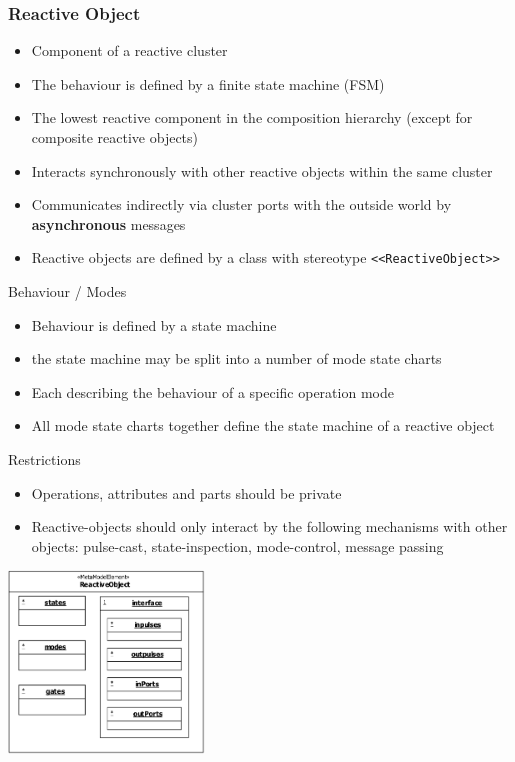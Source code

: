 \begin{paracol}{2}
    \subsubsection{Reactive Object}
    \begin{itemize}
        \item Component of a reactive cluster
        \item The behaviour is defined by a finite state machine (FSM)
        \item The lowest reactive component in the composition hierarchy (except for composite reactive objects)
        \item Interacts synchronously with other reactive objects within the same cluster
        \item Communicates indirectly via cluster ports with the outside world by \textbf{asynchronous} messages
        \item Reactive objects are defined by a class with stereotype \texttt{<<ReactiveObject>>}
    \end{itemize}
    Behaviour / Modes
    \begin{itemize}
        \item Behaviour is defined by a state machine
        \item the state machine may be split into a number of mode state charts
        \item Each describing the behaviour of a specific operation mode
        \item All mode state charts together define the state machine of a reactive object
    \end{itemize}
    Restrictions
    \begin{itemize}
        \item Operations, attributes and parts should be private
        \item Reactive-objects should only interact by the following mechanisms with other objects: pulse-cast, state-inspection, mode-control, message passing
    \end{itemize}

    \switchcolumn

    \includegraphics[width=0.39\textwidth]{images/ReactiveBehaviourNotation/meta_reactive_object.png}
\end{paracol}

